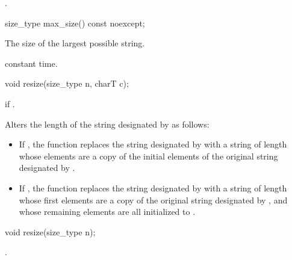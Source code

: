 \begin{itemdescr}
\pnum
\returns
{}.
\end{itemdescr}

%
%
\begin{itemdecl}
size_type max_size() const noexcept;
\end{itemdecl}

\begin{itemdescr}
\pnum
\returns
The size of the largest possible string.

\pnum
\complexity constant time.
\end{itemdescr}

%
%
\begin{itemdecl}
void resize(size_type n, charT c);
\end{itemdecl}

\begin{itemdescr}
\pnum
\requires
{}

\pnum
\throws
{}
if
.

\pnum
\effects
Alters the length of the string designated by
as follows:

\begin{itemize}
\item
If
,
the function replaces the string designated by
with a string of length  whose elements are a
copy of the initial elements of the original string designated by
.
\item
If
,
the function replaces the string designated by
with a string of length  whose first
elements are a copy of the original string designated by
,
and whose remaining elements are all initialized to .
\end{itemize}
\end{itemdescr}

%
%
\begin{itemdecl}
void resize(size_type n);
\end{itemdecl}

\begin{itemdescr}
\pnum
\effects
{}.
\end{itemdescr}


